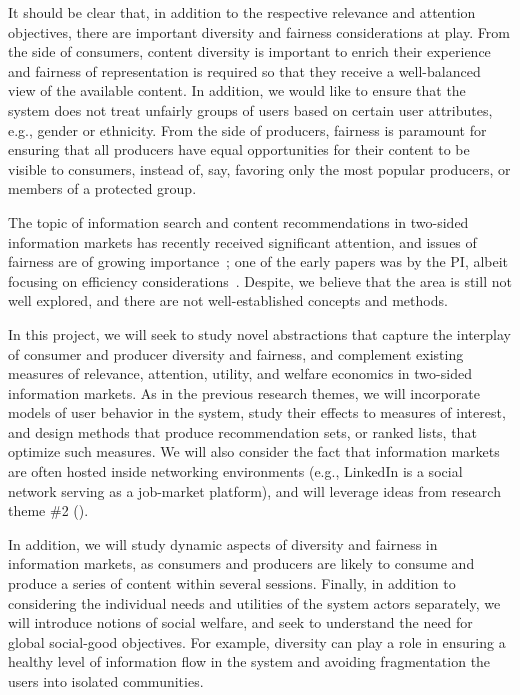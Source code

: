\documentclass[a4paper,11pt]{article}
\begin{document}
It should be clear that, in addition to the respective relevance and attention objectives, 
there are important diversity and fairness considerations at play. 
From the side of consumers, 
content diversity is important to enrich their experience and
fairness of representation is required so that they receive a well-balanced
view of the available content.
In addition, we would like to ensure that the system does not treat unfairly 
groups of users based on certain user attributes, e.g., gender or ethnicity. 
From the side of producers, 
fairness is paramount for ensuring that all producers have equal opportunities
for their content to be visible to consumers, 
instead of, say, favoring only the most popular producers, 
or members of a protected group. 

The topic of information search and content recommendations in two-sided information markets 
has recently received significant attention, 
and issues of fairness are of growing importance~\cite{do2021two,wang2021user};
one of the early papers was by the PI, 
albeit focusing on efficiency considerations~\cite{gdfm2011social}.
Despite, we believe that the area is still not well explored, 
and there are not well-established concepts and methods. 

In this project, we will seek to study novel abstractions
that capture the interplay of consumer and producer diversity and fairness, 
and complement existing measures of relevance, attention, utility, 
and welfare economics in two-sided information markets.
As in the previous research themes, 
we will incorporate models of user behavior in the system, 
study their effects to measures of interest, 
and design methods that produce recommendation sets, or ranked lists, 
that optimize such measures. 
We will also consider the fact that information markets are often hosted inside networking environments
(e.g., LinkedIn is a social network serving as a job-market platform), 
and will leverage ideas from research theme \#2 (\networks).

In addition, we will study dynamic aspects of diversity and fairness in information markets,
as consumers and producers are likely to consume and produce a series of content within several sessions.
Finally, in addition to considering the individual needs and utilities of the system actors separately, 
we will introduce notions of social welfare, 
and seek to understand the need for global social-good objectives.
For example, diversity can play a role in ensuring a healthy level of information flow in the system
and avoiding fragmentation the users into isolated communities.
\end{document}
